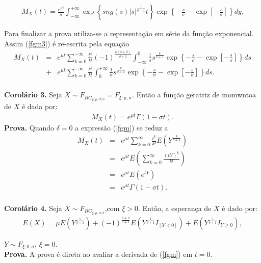 \documentclass[pdftex,11pt]{article}%
\numberwithin{equation}{section} %
\begin{document}
 \begin{eqnarray}\label{fgm3}
 	M_{X} (t)= \frac{e^{\mu t}}{\sigma} \int_{-\infty}^{+\infty} \exp\left\{sng(s )|s|^{\frac{1}{\delta+1}} t	\right\} \exp\left\{ - \frac{s}{\sigma}- \exp\left[-\frac{s}{\sigma}\right] \right\} dy.
 \end{eqnarray}
 
Para finalizar a prova utiliza-se a representação em série da função exponencial. Assim (\ref{fgm3}) é re-escrita pela equação
 \begin{eqnarray}\label{fgm4}
	M_{X} (t) &=& {e^{\mu t}} \sum_{k=0}^{-\infty} \frac{t^k}{k!}(-1)^{\frac{k(\delta+2)}{\delta+1}}  \int_{-\infty}^{0}\frac{1}{\sigma} s^{\frac{k}{\delta+1}} \exp\left\{ - \frac{s}{\sigma}- \exp\left[-\frac{s}{\sigma}\right] \right\} ds \nonumber\\
	&+& {e^{\mu t}} \sum_{k=0}^{-\infty}\frac{t^k}{k!}  \int_{0}^{+\infty} \frac{1}{\sigma} s^{\frac{k}{\delta+1}} \exp\left\{ - \frac{s}{\sigma}- \exp\left[-\frac{s}{\sigma}\right] \right\} ds.\nonumber
\end{eqnarray}
\vspace{1cm}\\
\textbf{Corolário 3.}
Seja $X\sim F_{BG_{\xi,\mu,\sigma, 0}}=F_{\xi,\mu,\sigma}$. Então a função geratriz de momwntoa de $X$ é  dada por:
\begin{eqnarray}
	M_{X} (t)=e^{\mu t} \Gamma (1-\sigma t).
\end{eqnarray}
\textbf{Prova.}
Quando $\delta=0$ a expressão (\ref{fgm}) se reduz a 
\begin{eqnarray}\label{fgm5}
	M_{X} (t)&=&{e^{\mu t}} \sum_{k=0}^{\infty} \frac{t^{k}}{k!}    E\left(Y^{\frac{k}{\delta+1}}\right) \nonumber\\
		     &=&{e^{\mu t}}  E\left( \sum_{k=0}^{\infty} \frac{(tY)^{k}}{k!} \right)  \nonumber\\
		     &=&{e^{\mu t}}  E\left( e^{tY} \right)\nonumber\\
		     &=&{e^{\mu t}} \Gamma(1-\sigma t). \nonumber
\end{eqnarray}
\vspace{1cm}\\
\textbf{Corolário 4.}  
Seja $X\sim F_{BG_{\xi,\mu,\sigma, \delta}}$,com $\xi>0$. Então, a esperança de  $X$ é  dado por:
\begin{eqnarray}
	E(X)=\mu E \left( Y^{\frac{1}{\delta+1}}\right) +(-1)^{\frac{\delta+2}{\delta+1}}E \left( Y^{\frac{1}{\delta+1}}I_{[Y<0]} \right) + E \left( Y^{\frac{1}{\delta+1}} I_{Y\geq 0} \right),
\end{eqnarray}

$Y\sim F_{\xi, 0, \sigma}$, $\xi=0$.
\\
\textbf{Prova.}
A prova é direta ao avaliar a derivada de (\ref{fgm}) em $t=0$. 
\end{document}

